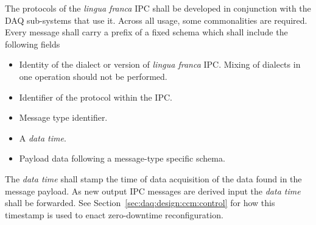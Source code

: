 The protocols of the \textit{lingua franca} IPC shall be developed in conjunction with the DAQ sub-systems that use it. 
Across all usage, some commonalities are required. 
Every message shall carry a prefix of a fixed schema which shall include the following fields

\begin{itemize}
\item Identity of the dialect or version of \textit{lingua franca} IPC.  Mixing of dialects in one operation should not be performed.
\item Identifier of the protocol within the IPC.
\item Message type identifier.
\item A \textit{data time}.
\item Payload data following a message-type specific schema.
\end{itemize}

The \textit{data time} shall stamp the time of data acquisition of the data found in the message payload. 
As new output IPC messages are derived input the \textit{data time} shall be forwarded.
See Section~\ref{sec:daq:design:ccm:control} for how this timestamp is used to enact zero-downtime reconfiguration.







